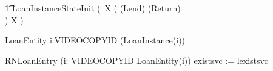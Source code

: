 \documentclass{article}
\begin{document}
\begin{circusaction}
   \t1 \circspot \lschexpract LoanInstanceStateInit \rschexpract \circseq  (\circmu\ X \circspot (
   					(Lend)
					\extchoice
					(Return)\\
					)
					\circseq X )
\end{circusaction}

\begin{circus}
\circend
\end{circus}

\begin{circus}
    \circprocess LoanEntity \circdef  i:VIDEOCOPYID \circspot (LoanInstance(i))  \\

\end{circus}


\begin{circus}
  \circprocess RNLoanEntry \circdef (i: VIDEOCOPYID \circspot LoanEntity(i)) 
        \lcircrename existsvc := lexistsvc \rcircrename
\end{circus}
\end{document}
